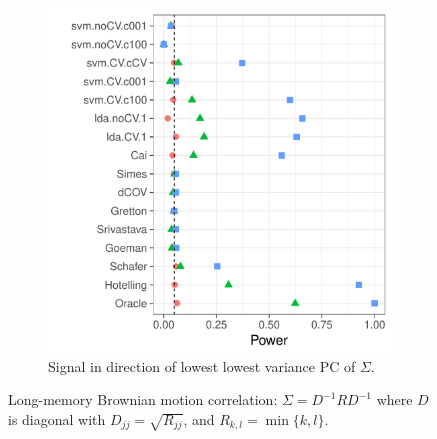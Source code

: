 \documentclass[]{bio}
\begin{document}
\begin{figure}[h]
\begin{subfigure}[t]{.45\columnwidth}
		\includegraphics[width=1\columnwidth]{"art/file23"}
		\caption{Signal in direction of lowest lowest variance PC of $\Sigma$.} 
		\label{fig:dependence_22}
	\end{subfigure}
	\caption{Long-memory Brownian motion correlation: $\Sigma=D^{-1} R D^{-1}$ where $D$ is diagonal with $D_{jj}=\sqrt{R_{jj}}$, and $R_{k,l}=\min\{k,l\}$.}	
	\label{fig:dependence_2}
\end{figure}
\end{document}
